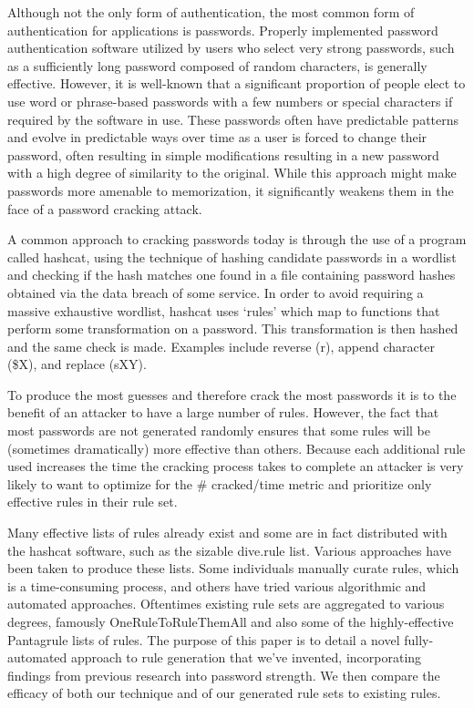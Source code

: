 \documentclass[letterpaper,twocolumn,10pt]{article}
\begin{document}
Although not the only form of authentication, the most common form of authentication for
applications is passwords. Properly implemented password authentication software utilized
by users who select very strong passwords, such as a sufficiently long password composed
of random characters, is generally effective. However, it is well-known that a significant
proportion of people elect to use word or phrase-based passwords with a few numbers or
special characters if required by the software in use. These passwords often have predictable
patterns and evolve in predictable ways over time as a user is forced to change their
password, often resulting in simple modifications resulting in a new password with a high
degree of similarity to the original.\cite{hanamsagar2018leveraging} While this approach
might make passwords more amenable to memorization, it significantly weakens them in the
face of a password cracking attack.

A common approach to cracking passwords today is through the use of a program called
hashcat, using the technique of hashing candidate passwords in a wordlist and checking
if the hash matches one found in a file containing password hashes obtained via the
data breach of some service. In order to avoid requiring a massive exhaustive wordlist,
hashcat uses `rules' which map to functions that perform some transformation on a password.
This transformation is then hashed and the same check is made. Examples include reverse (r),
append character (\$X), and replace (sXY).


To produce the most guesses and therefore crack the most passwords it is to the benefit of
an attacker to have a large number of rules. However, the fact that most passwords are
not generated randomly ensures that some rules will be (sometimes dramatically) more effective
than others. Because each additional rule used increases the time the cracking process takes
to complete an attacker is very likely to want to optimize for the \# cracked/time metric
and prioritize only effective rules in their rule set.

Many effective lists of rules already exist and some are in fact distributed with the
hashcat software, such as the sizable dive.rule list. Various approaches have been
taken to produce these lists. Some individuals manually curate rules, which is a 
time-consuming process, and others have tried various algorithmic and automated approaches.
Oftentimes existing rule sets are aggregated to various degrees, famously OneRuleToRuleThemAll
and also some of the highly-effective Pantagrule lists of rules.
The purpose of this paper is to detail a novel fully-automated approach to rule generation that
we've invented, incorporating findings from previous research into password strength. We then
compare the efficacy of both our technique and of our generated rule sets to existing rules.
\end{document}
